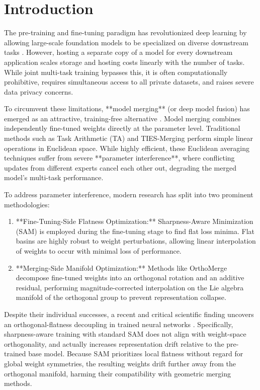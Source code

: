 \documentclass{article}
\theoremstyle{plain}
\theoremstyle{definition}
\theoremstyle{remark}
\begin{document}
\section{Introduction}
\label{submission-introduction}
The pre-training and fine-tuning paradigm has revolutionized deep learning by allowing large-scale foundation models to be specialized on diverse downstream tasks \cite{devlin2018bert, vaswani2017attention}. However, hosting a separate copy of a model for every downstream application scales storage and hosting costs linearly with the number of tasks. While joint multi-task training bypasses this, it is often computationally prohibitive, requires simultaneous access to all private datasets, and raises severe data privacy concerns.

To circumvent these limitations, **model merging** (or deep model fusion) has emerged as an attractive, training-free alternative \cite{wortsman2022model, ilharco2022editing}. Model merging combines independently fine-tuned weights directly at the parameter level. Traditional methods such as Task Arithmetic (TA) \cite{ilharco2022editing} and TIES-Merging \cite{yadav2023ties} perform simple linear operations in Euclidean space. While highly efficient, these Euclidean averaging techniques suffer from severe **parameter interference**, where conflicting updates from different experts cancel each other out, degrading the merged model's multi-task performance.

To address parameter interference, modern research has split into two prominent methodologies:
\begin{enumerate}
    \item **Fine-Tuning-Side Flatness Optimization:** Sharpness-Aware Minimization (SAM) \cite{foret2020sharpness} is employed during the fine-tuning stage to find flat loss minima. Flat basins are highly robust to weight perturbations, allowing linear interpolation of weights to occur with minimal loss of performance.
    \item **Merging-Side Manifold Optimization:** Methods like OrthoMerge \cite{yang2026orthogonal} decompose fine-tuned weights into an orthogonal rotation and an additive residual, performing magnitude-corrected interpolation on the Lie algebra manifold of the orthogonal group to prevent representation collapse.
\end{enumerate}

Despite their individual successes, a recent and critical scientific finding uncovers an orthogonal-flatness decoupling in trained neural networks \cite{spor2026}. Specifically, sharpness-aware training with standard SAM does not align with weight-space orthogonality, and actually increases representation drift relative to the pre-trained base model. Because SAM prioritizes local flatness without regard for global weight symmetries, the resulting weights drift further away from the orthogonal manifold, harming their compatibility with geometric merging methods.
\end{document}
